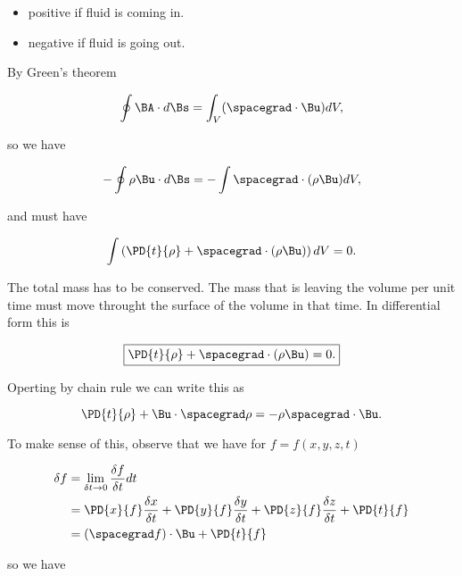 \begin{itemize}
\item 
positive if fluid is coming in.
\item 
negative if fluid is going out.
\end{itemize}

By Green's theorem

\begin{equation}\label{eqn:continuumL9:410}
\oint \BA \cdot d\Bs = \int_V (\spacegrad \cdot \Bu) dV,
\end{equation}

so we have

\begin{equation}\label{eqn:continuumL9:430}
-\oint \rho \Bu \cdot d\Bs = -\int \spacegrad \cdot (\rho \Bu ) dV,
\end{equation}

and must have

\begin{equation}\label{eqn:continuumL9:450}
\int \left( \PD{t}{\rho} + \spacegrad \cdot (\rho \Bu) \right) dV = 0.
\end{equation}

The total mass has to be conserved.  The mass that is leaving the volume per unit time must move throught the surface of the volume in that time.  In differential form this is

\begin{equation}\label{eqn:continuumL9:470}
\boxed{
\PD{t}{\rho} + \spacegrad \cdot (\rho \Bu) = 0.
}
\end{equation}

Operting by chain rule we can write this as

\begin{equation}\label{eqn:continuumL9:490}
\PD{t}{\rho} + \Bu \cdot \spacegrad \rho = - \rho \spacegrad \cdot \Bu.
\end{equation}

To make sense of this, observe that we have for $f = f(x, y, z, t)$

\begin{align*}
\delta f 
&= \lim_{\delta t \rightarrow 0} \frac{\delta f}{\delta t} dt \\
&=
\PD{x}{f} \frac{\delta x}{\delta t}
+\PD{y}{f} \frac{\delta y}{\delta t}
+\PD{z}{f} \frac{\delta z}{\delta t}
+ \PD{t}{f} \\
&=
(\spacegrad f) \cdot \Bu + \PD{t}{f}
\end{align*}

so we have

